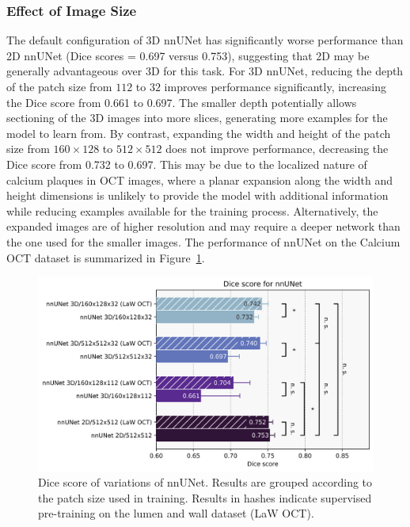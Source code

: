 \documentclass[a4paper,11pt,oneside]{report}
\begin{document}
\subsubsection{Effect of Image Size}
The default configuration of 3D nnUNet has significantly worse performance than 2D nnUNet (Dice scores = 0.697 versus 0.753), suggesting that 2D may be generally advantageous over 3D for this task. For 3D nnUNet, reducing the depth of the patch size from $112$ to $32$ improves performance significantly, increasing the Dice score from 0.661 to 0.697. The smaller depth potentially allows sectioning of the 3D images into more slices, generating more examples for the model to learn from. By contrast, expanding the width and height of the patch size from $160\times 128$ to $512\times 512$ does not improve performance, decreasing the Dice score from 0.732 to 0.697. This may be due to the localized nature of calcium plaques in OCT images, where a planar expansion along the width and height dimensions is unlikely to provide the model with additional information while reducing examples available for the training process. Alternatively, the expanded images are of higher resolution and may require a deeper network than the one used for the smaller images. The performance of nnUNet on the Calcium OCT dataset is summarized in Figure~\ref{fig:nnunet-results}.

\begin{figure}[h]
    \centering
    \includegraphics[width=0.8\linewidth]{figures/result_nnunet_results.png}
    \caption{Dice score of variations of nnUNet. Results are grouped according to the patch size used in training. Results in hashes indicate supervised pre-training on the lumen and wall dataset (LaW OCT). 
    }
    \label{fig:nnunet-results}
\end{figure}
\end{document}

